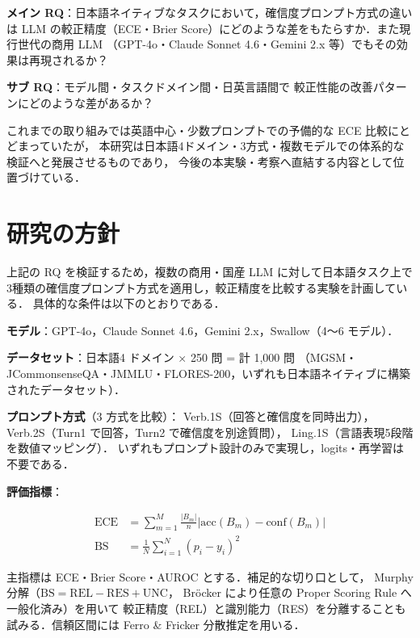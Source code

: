 \documentclass[10pt,a4paper,twocolumn]{article}
\begin{document}
\textbf{メイン RQ}：日本語ネイティブなタスクにおいて，確信度プロンプト方式の違いは
LLM の較正精度（ECE・Brier Score）にどのような差をもたらすか．また現行世代の商用 LLM
（GPT-4o・Claude Sonnet 4.6・Gemini 2.x 等）でもその効果は再現されるか？

\textbf{サブ RQ}：モデル間・タスクドメイン間・日英言語間で
較正性能の改善パターンにどのような差があるか？

これまでの取り組みでは英語中心・少数プロンプトでの予備的な ECE 比較にとどまっていたが，
本研究は日本語4ドメイン・3方式・複数モデルでの体系的な検証へと発展させるものであり，
今後の本実験・考察へ直結する内容として位置づけている．

\section{研究の方針}

上記の RQ を検証するため，複数の商用・国産 LLM に対して日本語タスク上で
3種類の確信度プロンプト方式を適用し，較正精度を比較する実験を計画している．
具体的な条件は以下のとおりである．

\textbf{モデル}：GPT-4o，Claude Sonnet 4.6，Gemini 2.x，Swallow（4〜6 モデル）．

\textbf{データセット}：日本語4 ドメイン × 250 問 = 計 1,000 問
（MGSM・JCommonsenseQA・JMMLU・FLORES-200，いずれも日本語ネイティブに構築されたデータセット）．

\textbf{プロンプト方式}（3 方式を比較）：
Verb.1S（回答と確信度を同時出力），
Verb.2S（Turn1 で回答，Turn2 で確信度を別途質問），
Ling.1S（言語表現5段階を数値マッピング）．
いずれもプロンプト設計のみで実現し，logits・再学習は不要である．

\textbf{評価指標}：

\begin{align}
  \text{ECE} &= \sum_{m=1}^{M} \frac{|B_m|}{n} \left|\text{acc}(B_m) - \text{conf}(B_m)\right| \\
  \text{BS} &= \frac{1}{N} \sum_{i=1}^{N} (p_i - y_i)^2
\end{align}

主指標は ECE・Brier Score・AUROC とする．補足的な切り口として，
Murphy 分解\cite{murphy1973vector}（$\text{BS} = \text{REL} - \text{RES} + \text{UNC}$，
Bröcker\cite{brocker2009reliability} により任意の Proper Scoring Rule へ一般化済み）を用いて
較正精度（REL）と識別能力（RES）を分離することも試みる．信頼区間には
Ferro \& Fricker 分散推定\cite{ferro2012decomposition}を用いる．
\end{document}
